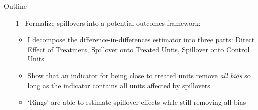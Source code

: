 \documentclass[aspectratio=169]{beamer}
\begin{document}
\begin{frame}{Outline}

    \begin{itemize}
        \item[1--] Formalize spillovers into a potential outcomes framework:
 
        \begin{citecolor}
        \end{citecolor}

        \begin{itemize}
            \vspace{2.5mm}
            \item I decompose the difference-in-differences estimator into three parts: Direct Effect of Treatment, Spillover onto Treated Units, Spillover onto Control Units
            
            \vspace{2.5mm}
            \item Show that an indicator for being close to treated units remove \textit{all bias} so long as the indicator contains all units affected by spillovers
            
            \vspace{2.5mm}
            \item `Rings' are able to estimate spillover effects while still removing all bias
        \end{itemize} 

    \end{itemize}
\end{frame}
\end{document}
